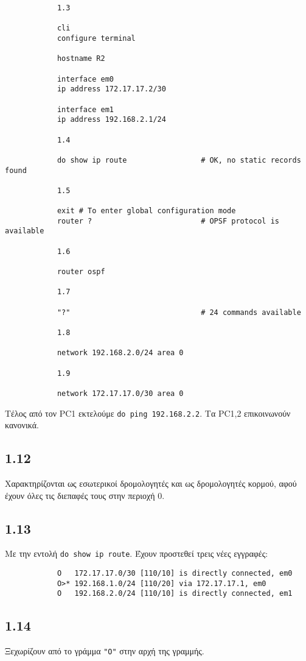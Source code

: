 \documentclass[a4paper, 12pt]{article}
\begin{document}
		\begin{verbatim}
			1.3
			
			cli
			configure terminal
		
			hostname R2
			
			interface em0
			ip address 172.17.17.2/30
			
			interface em1
			ip address 192.168.2.1/24
			
			1.4
			
			do show ip route                 # OK, no static records found
			
			1.5
			
			exit # To enter global configuration mode
			router ?                         # OPSF protocol is available
			
			1.6
			
			router ospf
			
			1.7
			
			"?"                              # 24 commands available
			
			1.8
			
			network 192.168.2.0/24 area 0
			
			1.9
			
			network 172.17.17.0/30 area 0
		\end{verbatim}

		Τέλος από τον PC1 εκτελούμε \verb|do ping 192.168.2.2|. Τα PC1,2 επικοινωνούν κανονικά.
	
	\subsection*{1.12}
		Χαρακτηρίζονται ως εσωτερικοί δρομολογητές και ως δρομολογητές κορμού, αφού έχουν όλες τις διεπαφές τους στην περιοχή 0.

	\subsection*{1.13}
		Με την εντολή \verb|do show ip route|. Έχουν προστεθεί τρεις νέες εγγραφές:
		
		\begin{verbatim}
			O   172.17.17.0/30 [110/10] is directly connected, em0
			O>* 192.168.1.0/24 [110/20] via 172.17.17.1, em0
			O   192.168.2.0/24 [110/10] is directly connected, em1
		\end{verbatim}

	\subsection*{1.14}
		Ξεχωρίζουν από το γράμμα \verb|"O"| στην αρχή της γραμμής.
\end{document}
